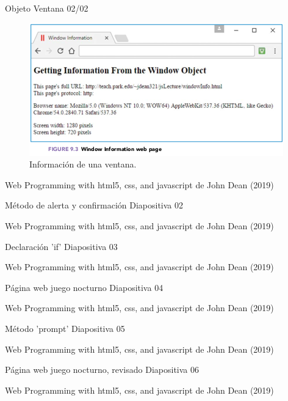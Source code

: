 \begin{frame}{Objeto Ventana 02/02}
\justifying
\begin{figure}[H]
\centering
\includegraphics[scale=0.5]{Section_Files/images/Sec02/02.png}
\caption{Información de una ventana.}
\end{figure}


{\tiny Web Programming with html5, css, and javascript de John Dean (2019)}
\end{frame}

\begin{frame}{Método de alerta y confirmación}
\justifying
Diapositiva 02


{\tiny Web Programming with html5, css, and javascript de John Dean (2019)}
\end{frame}

\begin{frame}{Declaración 'if'}
\justifying
Diapositiva 03


{\tiny Web Programming with html5, css, and javascript de John Dean (2019)}
\end{frame}

\begin{frame}{Página web juego nocturno}
\justifying
Diapositiva 04


{\tiny Web Programming with html5, css, and javascript de John Dean (2019)}
\end{frame}

\begin{frame}{Método 'prompt'}
\justifying
Diapositiva 05


{\tiny Web Programming with html5, css, and javascript de John Dean (2019)}
\end{frame}

\begin{frame}{Página web juego nocturno, revisado}
\justifying
Diapositiva 06


{\tiny Web Programming with html5, css, and javascript de John Dean (2019)}
\end{frame}

